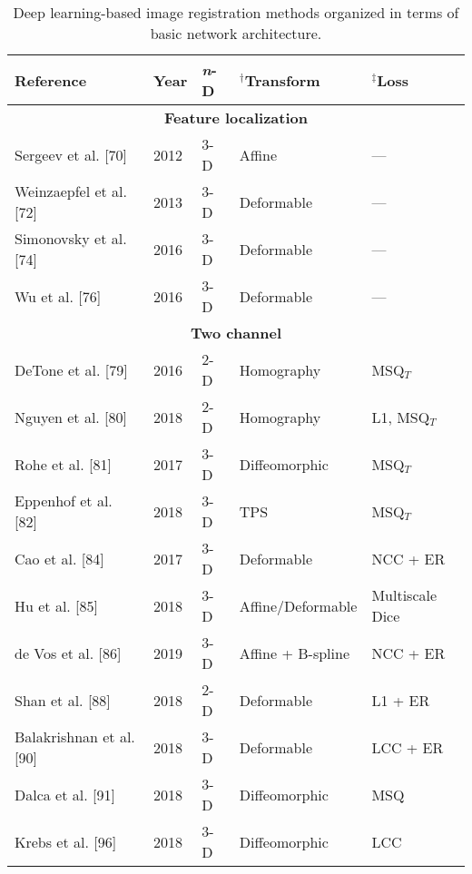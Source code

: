 \begin{table}[!htb]
\centering
\small
\caption{Deep learning-based image registration methods organized in terms of basic
         network architecture.}
\label{table:methods}
\begin{tabular*}{0.85\textwidth}{l l l l l}
\toprule
\midrule
\textbf{Reference} & \textbf{Year} & \textbf{\textit{n}-D} & $^\dagger$\textbf{Transform} & $^\ddagger$\textbf{Loss} \\
\midrule
\midrule
\multicolumn{5}{c}{\textbf{Feature localization}}
  \vspace{0.25cm} \\
  Sergeev et al. [70] & 2012 & 3-D & Affine & --- \\
  Weinzaepfel et al. [72] & 2013 & 3-D & Deformable & --- \\
  Simonovsky et al. [74] & 2016 & 3-D & Deformable & --- \\
  Wu et al. [76] & 2016 & 3-D & Deformable & --- \\
\midrule
\multicolumn{5}{c}{\textbf{Two channel}}
  \vspace{0.25cm} \\
  DeTone et al. [79] & 2016 & 2-D & Homography & MSQ$_T$ \\ %
  Nguyen et al. [80] & 2018 & 2-D & Homography & L1, MSQ$_T$ \\ %
  Rohe et al. [81] & 2017 & 3-D & Diffeomorphic & MSQ$_T$ \\  %
  Eppenhof et al. [82] & 2018 & 3-D & TPS & MSQ$_T$ \\       %
  Cao et al. [84] & 2017 & 3-D & Deformable & NCC + ER \\
  Hu et al. [85] & 2018 & 3-D & Affine/Deformable & Multiscale Dice \\
  de Vos et al. [86] & 2019 & 3-D & Affine + B-spline & NCC + ER \\
  Shan et al. [88] & 2018 & 2-D & Deformable & L1 + ER \\
  Balakrishnan et al. [90] & 2018 & 3-D & Deformable & LCC + ER \\
  Dalca et al. [91] & 2018 & 3-D & Diffeomorphic & MSQ \\
  Krebs et al. [96] & 2018 & 3-D & Diffeomorphic & LCC \\

\end{tabular*}
\end{table}
